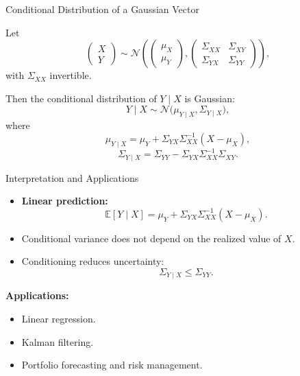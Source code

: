 \documentclass[aspectratio=169]{beamer}
\begin{document}

\begin{frame}{Conditional Distribution of a Gaussian Vector}

Let
\[
\begin{pmatrix} X \\ Y \end{pmatrix}
\sim
\mathcal{N}\!\left(
\begin{pmatrix} \mu_X \\ \mu_Y \end{pmatrix},
\begin{pmatrix}
\Sigma_{XX} & \Sigma_{XY} \\
\Sigma_{YX} & \Sigma_{YY}
\end{pmatrix}
\right),
\]
with \(\Sigma_{XX}\) invertible.\pause

\medskip

Then the conditional distribution of \(Y\mid X\) is Gaussian:
\[
Y\mid X
\sim
\mathcal{N}\!\big(
\mu_{Y\mid X},
\Sigma_{Y\mid X}
\big),
\]
where
\[
\mu_{Y\mid X}
=
\mu_Y
+
\Sigma_{YX}\Sigma_{XX}^{-1}(X-\mu_X),
\]
\[
\Sigma_{Y\mid X}
=
\Sigma_{YY}
-
\Sigma_{YX}\Sigma_{XX}^{-1}\Sigma_{XY}.
\]

\end{frame}


\begin{frame}{Interpretation and Applications}

\begin{itemize}
  \item \textbf{Linear prediction:}
  \[
  \mathbb{E}[Y\mid X]
  =
  \mu_Y
  +
  \Sigma_{YX}\Sigma_{XX}^{-1}(X-\mu_X).
  \]
  \item Conditional variance does not depend on the realized value of \(X\).
  \item Conditioning reduces uncertainty:
  \[
  \Sigma_{Y\mid X} \le \Sigma_{YY}.
  \]
\end{itemize}

\medskip

\textbf{Applications:}
\begin{itemize}
  \item Linear regression.
  \item Kalman filtering.
  \item Portfolio forecasting and risk management.
\end{itemize}

\end{frame}
\end{document}
